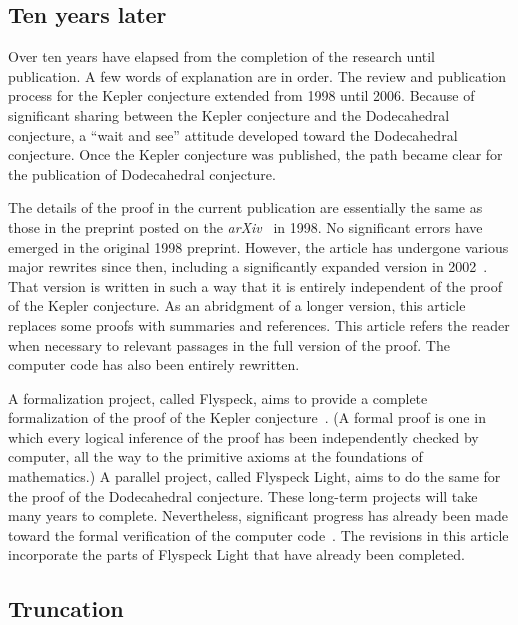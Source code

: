 \documentclass{article} %
\begin{document}
\subsection{Ten years later}

Over ten years have elapsed from the completion of the research until
publication. A few words of explanation are in order. The review and
publication process for the Kepler conjecture extended from 1998 until
2006. Because of significant sharing between the Kepler conjecture and
the Dodecahedral conjecture, a ``wait and see'' attitude developed
toward the Dodecahedral conjecture. Once the Kepler conjecture was
published, the path became clear for the publication of Dodecahedral
conjecture.

The details of the proof in the current publication are essentially
the same as those in the preprint posted on the
\emph{arXiv}~\cite{Hales:1998:Dodec} in 1998. No significant errors have
emerged in the original 1998 preprint.
However,
the article has undergone various major rewrites since then, including
a significantly expanded version in 2002~\cite{Hales:2002:Dodec}.
That version is written in such a way that it is
entirely independent of the proof of the Kepler conjecture.
As an abridgment of a longer version, this article replaces 
some proofs with summaries and references.   
This article refers the reader when necessary to relevant
passages in the full version of the proof.
The computer code has
also been entirely rewritten.


A formalization project, called Flyspeck, aims to provide a complete
formalization of the proof of the Kepler
conjecture~\cite{website:FlyspeckProject, website:FlyspeckFactSheet}.
(A formal proof is one in which every logical inference of the
proof has been independently checked by computer, all the way to the
primitive axioms at the foundations of mathematics.) A parallel
project, called Flyspeck Light, aims to do the same for the proof of
the Dodecahedral conjecture. These long-term projects will take many
years to complete. Nevertheless, significant progress has already been
made toward the formal verification of the computer
code~\cite{Nipkow:2005:Tame,Obua:2008:Thesis}. The revisions in this
article incorporate the parts of Flyspeck Light that have already been
completed.

\subsection{Truncation}
\end{document}
